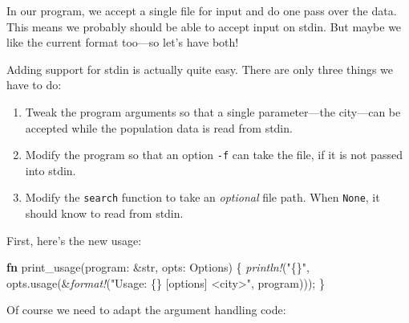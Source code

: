\documentclass[a4paper,]{book}
\newenvironment{Shaded}{\begin{snugshade}}{\end{snugshade}}
\newcommand{\KeywordTok}[1]{\textcolor[rgb]{0.13,0.29,0.53}{\textbf{{#1}}}}
\newcommand{\DataTypeTok}[1]{\textcolor[rgb]{0.13,0.29,0.53}{{#1}}}
\newcommand{\StringTok}[1]{\textcolor[rgb]{0.31,0.60,0.02}{{#1}}}
\newcommand{\PreprocessorTok}[1]{\textcolor[rgb]{0.56,0.35,0.01}{\textit{{#1}}}}
\newcommand{\NormalTok}[1]{{#1}}
\providecommand{\tightlist}{%
  \setlength{\itemsep}{0pt}\setlength{\parskip}{0pt}}
\begin{document}
In our program, we accept a single file for input and do one pass over
the data. This means we probably should be able to accept input on
stdin. But maybe we like the current format too---so let's have both!

Adding support for stdin is actually quite easy. There are only three
things we have to do:

\begin{enumerate}
\def\labelenumi{\arabic{enumi}.}
\tightlist
\item
  Tweak the program arguments so that a single parameter---the
  city---can be accepted while the population data is read from stdin.
\item
  Modify the program so that an option \texttt{-f} can take the file, if
  it is not passed into stdin.
\item
  Modify the \texttt{search} function to take an \emph{optional} file
  path. When \texttt{None}, it should know to read from stdin.
\end{enumerate}

First, here's the new usage:

\begin{Shaded}
\begin{Highlighting}[]
\KeywordTok{fn} \NormalTok{print_usage(program: &}\DataTypeTok{str}\NormalTok{, opts: Options) \{}
    \PreprocessorTok{println!}\NormalTok{(}\StringTok{"\{\}"}\NormalTok{, opts.usage(&}\PreprocessorTok{format!}\NormalTok{(}\StringTok{"Usage: \{\} [options] <city>"}\NormalTok{, program)));}
\NormalTok{\}}
\end{Highlighting}
\end{Shaded}

Of course we need to adapt the argument handling code:
\end{document}

